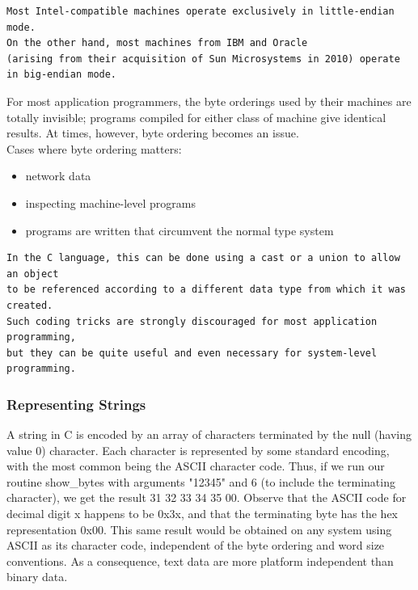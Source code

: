 \documentclass[11pt]{article}
\begin{document}
\begin{verbatim}
Most Intel-compatible machines operate exclusively in little-endian mode. 
On the other hand, most machines from IBM and Oracle 
(arising from their acquisition of Sun Microsystems in 2010) operate in big-endian mode. 
\end{verbatim}

For most application programmers, the byte orderings used by their machines are totally invisible; programs compiled for either class of machine give identical results. At times, however, byte ordering becomes an issue.\\
Cases where byte ordering matters:\\
\begin{itemize}
\item network data\\
\item inspecting machine-level programs\\
\item programs are written that circumvent the normal type system\\
\end{itemize}

\begin{verbatim}
In the C language, this can be done using a cast or a union to allow an object 
to be referenced according to a different data type from which it was created. 
Such coding tricks are strongly discouraged for most application programming, 
but they can be quite useful and even necessary for system-level programming.
\end{verbatim}


\subsubsection{Representing Strings}
\label{sec:orgce7d5ec}
A string in C is encoded by an array of characters terminated by the null (having value 0) character. Each character is represented by some standard encoding, with the most common being the ASCII character code. Thus, if we run our routine show\_bytes with arguments "12345" and 6 (to include the terminating character), we get the result 31 32 33 34 35 00. Observe that the ASCII code for decimal digit x happens to be 0x3x, and that the terminating byte has the hex representation 0x00. This same result would be obtained on any system using ASCII as its character code, independent of the byte ordering and word size conventions. As a consequence, text data are more platform independent than binary data.\\
\end{document}
